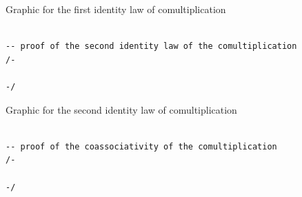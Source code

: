 \documentclass{book}
\newcounter{lcounter}
\begin{document}
\begin{center}
\begin{tcolorbox}[width=5in,colback={white},title={\begin{center} \texttt{Graphic} \addtocounter{lcounter}{1}  \end{center}},colbacktitle=Yellow,coltitle=black]

Graphic for the first identity law of comultiplication

\end{tcolorbox}
\end{center}


\begin{center}
\begin{tcolorbox}[width=5in,colback={white},title={\begin{center}\texttt{Lean \thelcounter} \addtocounter{lcounter}{1}  \end{center}},colbacktitle=Blue,coltitle=black]
\begin{verbatim}

-- proof of the second identity law of the comultiplication
/-

-/

\end{verbatim}%
\end{tcolorbox}
\end{center}

\begin{center}
\begin{tcolorbox}[width=5in,colback={white},title={\begin{center}\texttt{Graphic} \addtocounter{lcounter}{1}  \end{center}},colbacktitle=Yellow,coltitle=black]

Graphic for the second identity law of comultiplication

\end{tcolorbox}
\end{center}

\begin{center}
\begin{tcolorbox}[width=5in,colback={white},title={\begin{center}\texttt{Lean \thelcounter} \addtocounter{lcounter}{1}  \end{center}},colbacktitle=Blue,coltitle=black]
\begin{verbatim}

-- proof of the coassociativity of the comultiplication
/-

-/

\end{verbatim}%
\end{tcolorbox}
\end{center}
\end{document}
